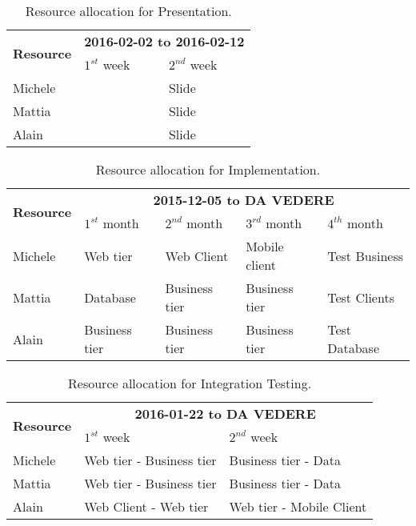 \begin{table}
    \centering
    \begin{tabular}{| l | l | l |}
        \hline
        \multirow{2}{*}{\textbf{Resource}} & \multicolumn{2}{c|}{\textbf{2016-02-02 to 2016-02-12}} \\
        \cline{2-3}
        & $1^{st}$ week & $2^{nd}$ week \\
        \hline
        Michele         &     & Slide    \\
        Mattia          &     & Slide    \\
        Alain           &     & Slide    \\
        \hline
    \end{tabular}
    \caption{Resource allocation for Presentation.}
    \label{tab:pres-res-alloc}
\end{table}


\begin{table}
    \centering
    \begin{tabular}{| l | l | l | l | l |}
        \hline
        \multirow{2}{*}{\textbf{Resource}} & \multicolumn{4}{c|}{\textbf{2015-12-05 to DA VEDERE}} \\
        \cline{2-5}
        & $1^{st}$ month & $2^{nd}$ month & $3^{rd} $ month & $4^{th}$ month\\
        \hline
        Michele        & Web tier       & Web Client     & Mobile client   & Test Business    \\
        Mattia         & Database       & Business tier  & Business tier   & Test Clients   \\
        Alain          & Business tier  & Business tier  & Business tier   & Test Database  \\
        \hline
    \end{tabular}
    \caption{Resource allocation for Implementation.}
    \label{tab:impl-res-alloc}
\end{table}

\begin{table}
    \centering
    \begin{tabular}{| l | l | l |}
        \hline
        \multirow{2}{*}{\textbf{Resource}} & \multicolumn{2}{c|}{\textbf{2016-01-22 to DA VEDERE}} \\
        \cline{2-3}
        & $1^{st}$ week & $2^{nd}$ week \\
        \hline
        Michele       &   Web tier - Business tier    & Business tier  - Data     \\
        Mattia        &   Web tier - Business tier    & Business tier  - Data    \\
        Alain         &   Web Client - Web tier       & Web tier - Mobile Client    \\
        \hline
    \end{tabular}
    \caption{Resource allocation for Integration Testing.}
    \label{tab:int-test-res-alloc}
\end{table}
